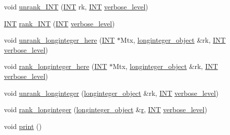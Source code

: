 \begin{DoxyCompactItemize}
\item 
void \mbox{\hyperlink{classgrassmann_a32079405b95a6da2ba1420567d762d64}{unrank\+\_\+\+I\+NT}} (\mbox{\hyperlink{galois_8h_a09fddde158a3a20bd2dcadb609de11dc}{I\+NT}} rk, \mbox{\hyperlink{galois_8h_a09fddde158a3a20bd2dcadb609de11dc}{I\+NT}} \mbox{\hyperlink{simeon_8_c_a818073fbcc2f439e7c56952f67386122}{verbose\+\_\+level}})
\item 
\mbox{\hyperlink{galois_8h_a09fddde158a3a20bd2dcadb609de11dc}{I\+NT}} \mbox{\hyperlink{classgrassmann_a1fa95ce7ecebd48b04c7a0dc75491184}{rank\+\_\+\+I\+NT}} (\mbox{\hyperlink{galois_8h_a09fddde158a3a20bd2dcadb609de11dc}{I\+NT}} \mbox{\hyperlink{simeon_8_c_a818073fbcc2f439e7c56952f67386122}{verbose\+\_\+level}})
\item 
void \mbox{\hyperlink{classgrassmann_a0e7283e3925e266cb18b6a3557822ab9}{unrank\+\_\+longinteger\+\_\+here}} (\mbox{\hyperlink{galois_8h_a09fddde158a3a20bd2dcadb609de11dc}{I\+NT}} $\ast$Mtx, \mbox{\hyperlink{classlonginteger__object}{longinteger\+\_\+object}} \&rk, \mbox{\hyperlink{galois_8h_a09fddde158a3a20bd2dcadb609de11dc}{I\+NT}} \mbox{\hyperlink{simeon_8_c_a818073fbcc2f439e7c56952f67386122}{verbose\+\_\+level}})
\item 
void \mbox{\hyperlink{classgrassmann_a9f3af02709205bca69e61d529e921212}{rank\+\_\+longinteger\+\_\+here}} (\mbox{\hyperlink{galois_8h_a09fddde158a3a20bd2dcadb609de11dc}{I\+NT}} $\ast$Mtx, \mbox{\hyperlink{classlonginteger__object}{longinteger\+\_\+object}} \&rk, \mbox{\hyperlink{galois_8h_a09fddde158a3a20bd2dcadb609de11dc}{I\+NT}} \mbox{\hyperlink{simeon_8_c_a818073fbcc2f439e7c56952f67386122}{verbose\+\_\+level}})
\item 
void \mbox{\hyperlink{classgrassmann_aede73ec7ffd4596b9b9953f5583bdc76}{unrank\+\_\+longinteger}} (\mbox{\hyperlink{classlonginteger__object}{longinteger\+\_\+object}} \&rk, \mbox{\hyperlink{galois_8h_a09fddde158a3a20bd2dcadb609de11dc}{I\+NT}} \mbox{\hyperlink{simeon_8_c_a818073fbcc2f439e7c56952f67386122}{verbose\+\_\+level}})
\item 
void \mbox{\hyperlink{classgrassmann_a906995e619188ae6e2e4e97f1e878a08}{rank\+\_\+longinteger}} (\mbox{\hyperlink{classlonginteger__object}{longinteger\+\_\+object}} \&\mbox{\hyperlink{alphabet2_8_c_acab531abaa74a7e664e3986f2522b33a}{r}}, \mbox{\hyperlink{galois_8h_a09fddde158a3a20bd2dcadb609de11dc}{I\+NT}} \mbox{\hyperlink{simeon_8_c_a818073fbcc2f439e7c56952f67386122}{verbose\+\_\+level}})
\item 
void \mbox{\hyperlink{classgrassmann_a7597fa53f5ac361952fbe88fad1dde05}{print}} ()

\end{DoxyCompactItemize}
